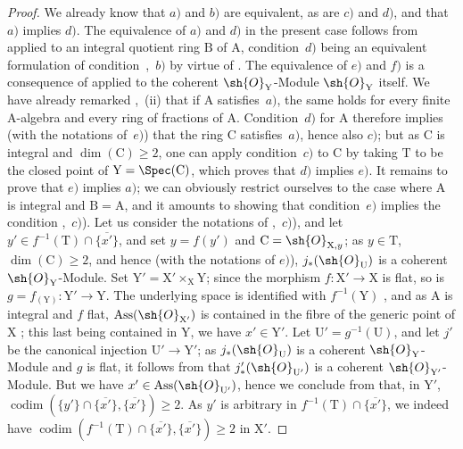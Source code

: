\begin{proof}
We already know  that $a)$ and $b)$ are equivalent, as are $c)$ and $d)$, and that $a)$ implies $d)$.
The equivalence of $a)$ and $d)$ in the present case follows from  applied to an integral quotient ring $\mathrm{B}$ of $\mathrm{A}$, condition~$d)$ being an equivalent formulation of condition~,~$b)$ by virtue of .
The equivalence of $e)$ and $f)$ is a consequence of  applied to the coherent $\sh{O}_\mathrm{Y}$-Module $\sh{O}_\mathrm{Y}$ itself.
We have already remarked ,~(ii) that if $\mathrm{A}$ satisfies~$a)$, the same holds for every finite A-algebra and every ring of fractions of $\mathrm{A}$.
Condition~$d)$ for $\mathrm{A}$ therefore implies (with the notations of~$e)$) that the ring $\mathrm{C}$ satisfies~$a)$, hence also $c)$; but as $\mathrm{C}$ is integral and $\dim(\mathrm{C})\geqslant 2$, one can apply condition~$c)$ to $\mathrm{C}$ by taking $\mathrm{T}$ to be the closed point of $\mathrm{Y}=\Spec(\mathrm{C})$, which proves that $d)$ implies $e)$.
It remains to prove that $e)$ implies $a)$;
we can obviously restrict ourselves to the case where $\mathrm{A}$ is integral and $\mathrm{B}=\mathrm{A}$, and it amounts to showing that condition~$e)$ implies the condition ,~$c)$).
Let us consider the notations of ,~$c)$), and let $y'\in f^{-1}(\mathrm{T})\cap\overline{\{x'\}}$, and set $y=f(y')$ and $\mathrm{C}=\sh{O}_{\mathrm{X},y}$; as $y\in\mathrm{T}$, $\dim(\mathrm{C})\geqslant 2$, and hence (with the notations of $e)$), $j_*(\sh{O}_\mathrm{U})$ is a coherent $\sh{O}_\mathrm{Y}$-Module.
Set $\mathrm{Y}'=\mathrm{X}'\times_\mathrm{X}\mathrm{Y}$; since the morphism $f:\mathrm{X}'\to\mathrm{X}$ is flat, so is $g=f_{(\mathrm{Y})}:\mathrm{Y}'\to\mathrm{Y}$.
The underlying space is identified with $f^{-1}(\mathrm{Y})$ , and as $\mathrm{A}$ is integral and $f$ flat, $\operatorname{Ass}(\sh{O}_{\mathrm{X}'})$ is contained in the fibre of the generic point of $\mathrm{X}$ ; this last being contained in $\mathrm{Y}$, we have $x'\in\mathrm{Y}'$.
Let $\mathrm{U}'=g^{-1}(\mathrm{U})$, and let $j'$ be the canonical injection $\mathrm{U}'\to\mathrm{Y}'$; as $j_*(\sh{O}_\mathrm{U})$ is a coherent $\sh{O}_\mathrm{Y}$-Module and $g$ is flat, it follows from  that $j'_*(\sh{O}_{\mathrm{U}'})$ is a coherent $\sh{O}_{\mathrm{Y}'}$-Module.
But we have $x'\in\operatorname{Ass}(\sh{O}_{\mathrm{U}'})$, hence we conclude from  that, in $\mathrm{Y}'$,
$\operatorname{codim}(\{y'\}\cap\overline{\{x'\}},\overline{\{x'\}})\geqslant 2$.
As $y'$ is arbitrary in $f^{-1}(\mathrm{T})\cap\overline{\{x'\}}$, we indeed have
$\operatorname{codim}(f^{-1}(\mathrm{T})\cap\overline{\{x'\}},\overline{\{x'\}})\geqslant 2$ in $\mathrm{X}'$.
\end{proof}

